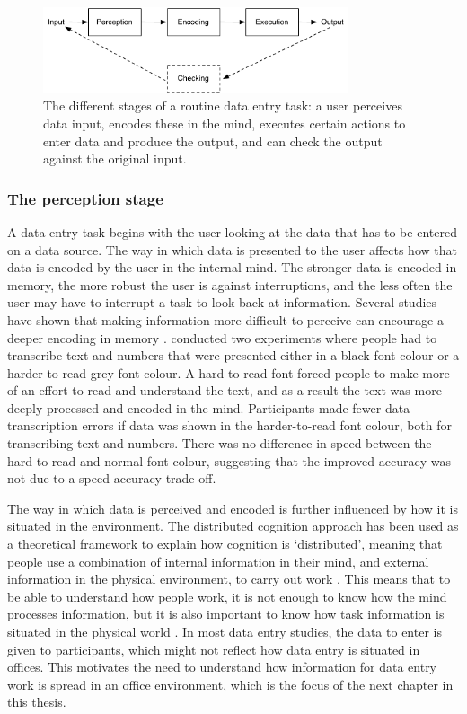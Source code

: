 \begin{figure}[!ht]
\centering
\includegraphics[width=0.8\textwidth]{images/background/HIP.pdf}
\caption[Different stages of a data entry task]{The different stages of a routine data entry task: a user perceives data input, encodes these in the mind, executes certain actions to enter data and produce the output, and can check the output against the original input.}
\vspace{-3pt}
\label{fig:ch2_hip}
\end{figure}


\subsubsection{The perception stage}
A data entry task begins with the user looking at the data that has to be entered on a data source.  The way in which data is presented to the user affects how that data is encoded by the user in the internal mind. The stronger data is encoded in memory, the more robust the user is against interruptions, and the less often the user may have to interrupt a task to look back at information. Several studies have shown that making information more difficult to perceive can encourage a deeper encoding in memory \citep{Diemand-Yauman2011, Soboczenski2013}. \citet{Soboczenski2013} conducted two experiments where people had to transcribe text and numbers that were presented either in a black font colour or a harder-to-read grey font colour. A hard-to-read font forced people to make more of an effort to read and understand the text, and as a result the text was more deeply processed and encoded in the mind. Participants made fewer data transcription errors if data was shown in the harder-to-read font colour, both for transcribing text and numbers. There was no difference in speed between the hard-to-read and normal font colour, suggesting that the improved accuracy was not due to a speed-accuracy trade-off. 

The way in which data is perceived and encoded is further influenced by how it is situated in the environment. The distributed cognition approach has been used as a theoretical framework to explain how cognition is ‘distributed’, meaning that people use a combination of internal information in their mind, and external information in the physical environment, to carry out work \citep{Hollan2000, Hutchins1995}. This means that to be able to understand how people work, it is not enough to know how the mind processes information, but it is also important to know how task information is situated in the physical world \citep{Hollan2000}. In most data entry studies, the data to enter is given to participants, which might not reflect how data entry is situated in offices. This motivates the need to understand how information for data entry work is spread in an office environment, which is the focus of the next chapter in this thesis. 


